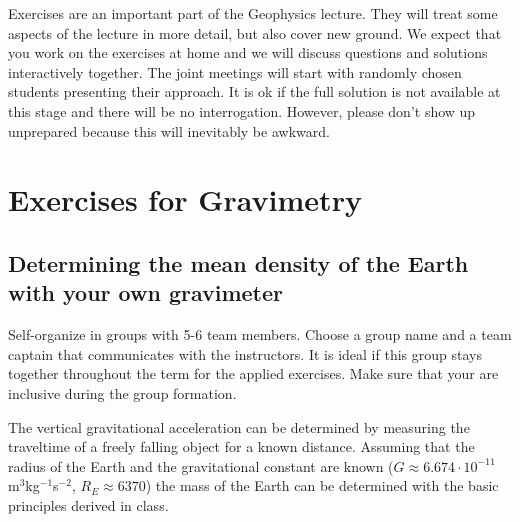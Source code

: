 \documentclass[a4paper,12pt]{article}
\begin{document}
\begin{tcolorbox}[enhanced jigsaw,breakable,pad at break*=1mm,
    colback=blue!5!white,colframe=burgundy,title=Expectations for Exercises]
    Exercises are an important part of the Geophysics lecture. They will treat some aspects of the lecture in more detail, but also cover new ground. We expect that you work on the exercises at home and we will discuss questions and solutions interactively together. The joint meetings will start with randomly chosen students presenting their approach. It is ok if the full solution is not available at this stage and there will be no interrogation. However, please don't show up unprepared because this will inevitably be awkward. 
\end{tcolorbox}

\section{Exercises for Gravimetry}
\subsection{Determining the mean density of the Earth with your own gravimeter}
\begin{tcolorbox}[enhanced jigsaw,breakable,pad at break*=1mm,
    colback=blue!5!white,colframe=burgundy,title=Group Work,
    watermark color=white]
    Self-organize in groups with 5-6 team members. Choose a group name and a team captain that communicates with the instructors. It is ideal if this group stays together throughout the term for the applied exercises. Make sure that your are inclusive during the group formation.
\end{tcolorbox}

  The vertical gravitational acceleration can be determined by measuring the traveltime of a freely falling object for a known distance. Assuming that the radius of the Earth and the gravitational constant are known ($G\approx6.674\cdot10^{-11}$ m$^{3}$kg$^{-1}$s$^{-2}$, $R_E \approx 6370 $) the mass of the Earth can be determined with the basic principles derived in class.
\end{document}
